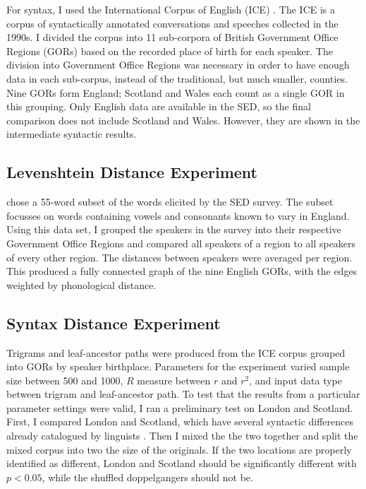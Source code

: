 \documentclass[11pt]{article}
\begin{document}
For syntax, I used the International Corpus of English (ICE)
\cite{nelson02}. The ICE is a corpus of syntactically annotated
conversations and speeches collected in the 1990s. I divided the
corpus into 11 sub-corpora of British Government Office Regions (GORs)
based on the recorded place of birth for each speaker. The division
into Government Office Regions was necessary in order to have enough
data in each sub-corpus, instead of the traditional, but much smaller,
counties. Nine GORs form England; Scotland and Wales each count as a
single GOR in this grouping. Only English data are available in the
SED, so the final comparison does not include Scotland and
Wales. However, they are shown in the intermediate syntactic results.

\subsection{Levenshtein Distance Experiment}

 chose a 55-word subset of the words elicited
by the SED survey. The subset focusses on words containing vowels and
consonants known to vary in England. Using this data set, I grouped
the speakers in the survey into their respective Government Office
Regions and compared all speakers of a region to all speakers of every
other region. The distances between speakers were averaged per region.
This produced a fully connected graph of the nine English GORs, with
the edges weighted by phonological distance.

\subsection{Syntax Distance Experiment}

Trigrams and leaf-ancestor paths were produced from the ICE corpus
grouped into GORs by speaker birthplace. Parameters for the experiment
varied sample size between 500 and 1000, $R$ measure between $r$ and
$r^2$, and input data type between trigram and leaf-ancestor path. To
test that the results from a particular parameter settings were valid,
I ran a preliminary test on London and Scotland. First, I
compared London and Scotland, which have several syntactic
differences already catalogued by linguists \cite{aitken79}.  Then I
mixed the the two together and split the mixed corpus into two the size of
the originals. If the two locations are properly identified as
different, London and Scotland should be significantly different with
$p < 0.05$, while the shuffled doppelgangers should not be.
\end{document}
